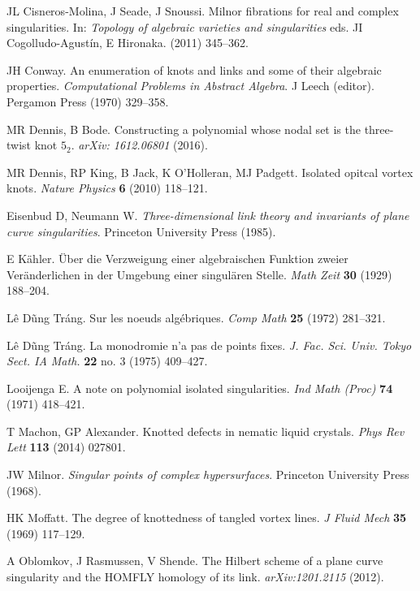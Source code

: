 \documentclass[notitlepage,12pt]{revtex4-1}
\begin{document}
\begin{thebibliography}{99}
 JL Cisneros-Molina, J Seade, J Snoussi. Milnor fibrations for real and complex singularities. In: \textit{Topology of algebraic varieties and singularities} eds. JI Cogolludo-Agust{\'i}n, E Hironaka. (2011) 345--362.

 JH Conway. An enumeration of knots and links and some of their algebraic properties. \textit{Computational Problems in Abstract Algebra}. J Leech (editor). Pergamon Press (1970) 329--358.

 MR Dennis, B Bode. Constructing a polynomial whose nodal set is the three-twist knot $5_2$. \textit{arXiv: 1612.06801} (2016).

 MR Dennis, RP King, B Jack, K O'Holleran, MJ Padgett. Isolated opitcal vortex knots. \textit{Nature Physics} \textbf{6} (2010) 118--121.

 Eisenbud D, Neumann W. \textit{Three-dimensional link theory and invariants of plane curve singularities}. Princeton University Press (1985).

 E K{\"a}hler. {\"U}ber die Verzweigung einer algebraischen Funktion zweier Ver{\"a}nderlichen in der Umgebung einer singul{\"a}ren Stelle. \textit{Math Zeit} \textbf{30} (1929) 188--204.

 L{\^e} D{\~u}ng Tr{\'a}ng. Sur les noeuds alg\'{e}briques. \textit{Comp Math} \textbf{25} (1972) 281--321.

 L{\^e} D{\~u}ng Tr{\'a}ng. La monodromie n'a pas de points fixes. \textit{J. Fac. Sci. Univ. Tokyo Sect. IA Math.} \textbf{22} no. 3 (1975) 409--427.

 Looijenga E. A note on polynomial isolated singularities. \textit{Ind Math (Proc)} \textbf{74} (1971) 418--421.

 T Machon, GP Alexander. Knotted defects in nematic liquid crystals. \textit{Phys Rev Lett} \textbf{113} (2014) 027801.

 JW Milnor. \textit{Singular points of complex hypersurfaces}. Princeton University Press (1968).

 HK Moffatt. The degree of knottedness of tangled vortex lines. \textit{J Fluid Mech} \textbf{35} (1969) 117--129.

 A Oblomkov, J Rasmussen, V Shende. The Hilbert scheme of a plane curve singularity and the HOMFLY homology of its link. \textit{arXiv:1201.2115} (2012).


\end{thebibliography}
\end{document}
